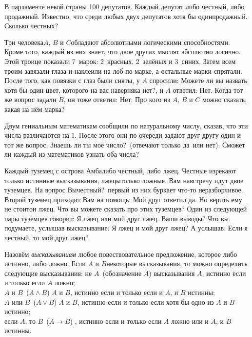 \documentclass[12pt]{article}
\begin{document}


В парламенте некой страны 100 депутатов. Каждый депутат либо честный, либо продажный. Известно, что среди любых двух депутатов хотя бы один\т продажный. Сколько честных?

    Три человека\т $A$, $B$ и $C$\т обладают абсолютными логическими способностями. Кроме того, каждый из них знает, что двое других мыслят абсолютно логично. Этой троице показали 7~марок: 2~красных, 2~зелёных и 3~синих. Затем всем троим завязали глаза и наклеили на лоб по марке, а остальные марки спрятали. После того, как повязки с глаз были сняты, у $A$ спросили:  Можете ли вы назвать хотя бы один цвет, которого на вас наверняка нет?, и $A$ ответил:  Нет. Когда тот же вопрос задали $B$, он тоже ответил:  Нет. Про кого из $A$, $B$ и $C$ можно сказать, какая на нём марка?

Двум гениальным математикам сообщили по натуральному числу, сказав, что эти числа различаются на 1. После этого они по очереди задают друг другу один и тот же вопрос:  Знаешь ли ты моё число?\ (отвечают только  да\ или  нет). Сможет ли каждый из математиков узнать оба числа?


Каждый туземец с острова Амба\т либо честный, либо лжец. Честные изрекают только истинные высказывания, лжецы\т только ложные.
Вам навстречу идут двое туземцев. На вопрос  Вы\т честный?\ первый из них буркает что-то неразборчивое. Второй туземец приходит Вам на помощь:  Мой друг ответил  да. Но верить ему не стоит\т он лжец. Что вы можете сказать про этих туземцев?
Один из следующей пары туземцев говорит:  Я лжец или мой друг лжец. Ваши выводы?
Что вы подумаете, услышав высказывание:  Я лжец и мой друг лжец?
А услышав:  Если я честный, то мой друг лжец?

Назовём {\it высказыванием} любое повествовательное предложение, которое либо истинно, либо ложно. Если $A$ и $B$\т некоторые высказывания, то можно определить следующие высказывания:
 не $A$\ (обозначение $\overline A$) высказывания $A$, истинно если и только если $A$ ложно;\\
 $A$ и $B$\ ($A\wedge B$) $A$ и $B$, истинно если и только если и $A$, и $B$ истинны; \\
 $A$ или $B$\ ($A\vee B$) $A$ и $B$, истинно если и только если хотя бы одно из $A$ и $B$ истинно; \\
 если $A$, то $B$\ ($A\to B$) , истинно если и только если $A$ ложно или и $A$, и $B$ истинны.
\end{document}
